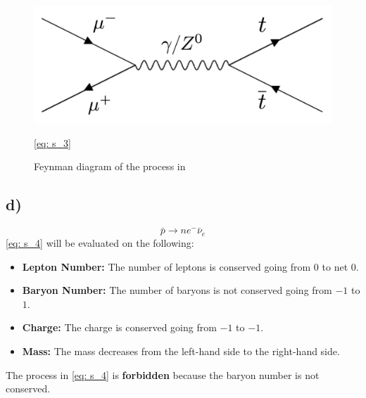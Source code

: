 \documentclass{article}
\begin{document}
\begin{figure}[ht!]
\centering
\includegraphics[width = .45\textwidth]{8c.jpeg}
\caption{Feynman diagram of the process in} \cref{eq: s_3}
\label{fig: 8c}
\end{figure}


\subsection*{d)}
\begin{equation}\label{eq: s_4}
\bar{p} → ne^{-}\bar{ν}_e
\end{equation}
\cref{eq: s_4} will be evaluated on the following:
\begin{itemize}
    \item \textbf{Lepton Number:} The number of leptons is conserved going from 0 to net 0.
    \item \textbf{Baryon Number:} The number of baryons is not conserved going from $-1$ to $1$.
    \item \textbf{Charge:} The charge is conserved going from $-1$ to $-1$.
    \item \textbf{Mass:} The mass decreases from the left-hand side to the right-hand side.
\end{itemize}
The process in \cref{eq: s_4} is \textbf{forbidden} because the baryon number is not conserved. 
\end{document}

